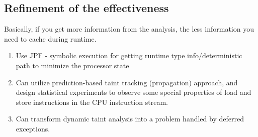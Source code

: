 \documentclass[conference]{IEEEtran}
\begin{document}
\subsection{Refinement of the effectiveness}
Basically, if you get more information from the analysis, the less information you need to cache during runtime.
\begin{enumerate}
\item Use JPF - symbolic execution for getting runtime type info/deterministic path to minimize the processor state
\item Can utilize prediction-based taint tracking (propagation) approach, and design statistical experiments to observe some special properties of load and store instructions in the CPU instruction stream.
\item Can transform dynamic taint analysis into a problem handled by deferred exceptions.
\end{enumerate}
\end{document}
